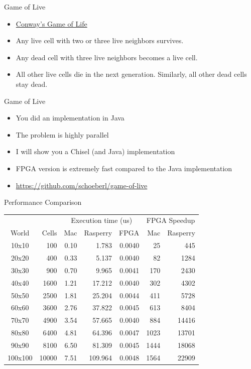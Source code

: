 \begin{frame}[fragile]{Game of Live}
\begin{itemize}
\item \href{https://en.wikipedia.org/wiki/Conway\%27s_Game_of_Life}{Conway's Game of Life}
\item Any live cell with two or three live neighbors survives.
\item Any dead cell with three live neighbors becomes a live cell.
\item All other live cells die in the next generation. Similarly, all other dead cells stay dead.
\end{itemize}
\end{frame}

\begin{frame}[fragile]{Game of Live}
\begin{itemize}
\item You did an implementation in Java
\item The problem is highly parallel
\item I will show you a Chisel (and Java) implementation
\item FPGA version is extremely fast compared to the Java implementation
\item \url{https://github.com/schoeberl/game-of-live}
\end{itemize}
\end{frame}

\begin{frame}[fragile]{Performance Comparison}
\begin{table}
  \centering
\begin{tabular}{crrrrrr}
    \toprule
    & &\multicolumn{3}{c}{Execution time (us)} & \multicolumn{2}{c}{FPGA Speedup}\\
World & Cells&Mac&Rasperry&FPGA& Mac& Rasperry\\
\midrule
10x10 & 100&0.10&1.783&0.0040&25&445\\
20x20 & 400&0.33&5.137&0.0040&82&1284\\
30x30 & 900&0.70&9.965&0.0041&170&2430\\
40x40 & 1600&1.21&17.212&0.0040&302&4302\\
50x50 & 2500&1.81&25.204&0.0044&411&5728\\
60x60 & 3600&2.76&37.822&0.0045&613&8404\\
70x70 & 4900&3.54&57.665&0.0040&884&14416\\
80x80 & 6400&4.81&64.396&0.0047&1023&13701\\
90x90 & 8100&6.50&81.309&0.0045&1444&18068\\
100x100 & 10000&7.51&109.964&0.0048&1564&22909\\
\bottomrule
\end{tabular}
    \label{tab:speedup}
\end{table}
\end{frame}

